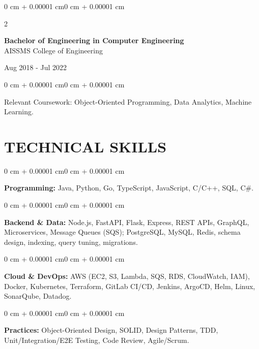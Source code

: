 \documentclass[10pt, letterpaper]{article}
\newenvironment{onecolentry}{
    \begin{adjustwidth}{0 cm + 0.00001 cm}{0 cm + 0.00001 cm}
}{
    \end{adjustwidth}
}
\newenvironment{twocolentry}[2][]{
    \onecolentry
    \def\secondColumn{#2}
    \setcolumnwidth{\fill, 4.5 cm}
    \begin{paracol}{2}
}{
    \switchcolumn \raggedleft \secondColumn
    \end{paracol}
    \endonecolentry
}
\begin{document}
\begin{twocolentry}{
    Aug 2018 - Jul 2022
}
    \textbf{Bachelor of Engineering in Computer Engineering} \\
    AISSMS College of Engineering
\end{twocolentry}
\begin{onecolentry}
Relevant Coursework: Object-Oriented Programming, Data Analytics, Machine Learning.
\end{onecolentry}
\section{TECHNICAL SKILLS}
\begin{onecolentry}
\textbf{Programming:} Java, Python, Go, TypeScript, JavaScript, C/C++, SQL, C\#.
\end{onecolentry}
\vspace{0.06 cm}
\begin{onecolentry}
\textbf{Backend \& Data:} Node.js, FastAPI, Flask, Express, REST APIs, GraphQL, Microservices, Message Queues (SQS); PostgreSQL, MySQL, Redis, schema design, indexing, query tuning, migrations.
\end{onecolentry}
\vspace{0.06 cm}
\begin{onecolentry}
\textbf{Cloud \& DevOps:} AWS (EC2, S3, Lambda, SQS, RDS, CloudWatch, IAM), Docker, Kubernetes, Terraform, GitLab CI/CD, Jenkins, ArgoCD, Helm, Linux, SonarQube, Datadog.
\end{onecolentry}
\vspace{0.06 cm}
\begin{onecolentry}
\textbf{Practices:} Object-Oriented Design, SOLID, Design Patterns, TDD, Unit/Integration/E2E Testing, Code Review, Agile/Scrum.
\end{onecolentry}

\end{document}
